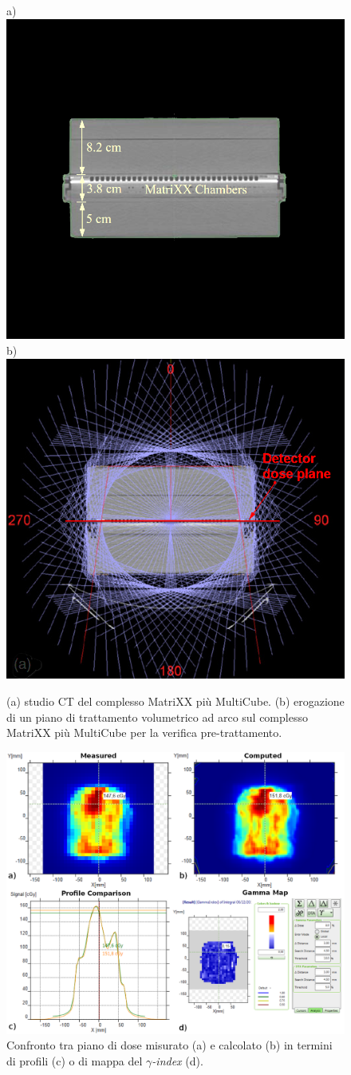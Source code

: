 \begin{figure}
\centering
a)\includegraphics[width=.45\textwidth]{./cap2/MatriXX_CT.png}
b)\includegraphics[width=.45\textwidth]{./cap2/MatriXX_CT_Plan.png}
\caption{(a) studio CT del complesso MatriXX più MultiCube. (b) erogazione di un piano di trattamento volumetrico ad arco sul complesso MatriXX più MultiCube per la verifica pre-trattamento.}
\label{fig:MatriXX_CT}
\end{figure}

\begin{figure}
\centering
\includegraphics[width=\textwidth]{./cap2/gamma_comparison.png}
\caption{Confronto tra piano di dose misurato (a) e calcolato (b) in termini di profili (c) o di mappa del $\gamma$\textit{-index} (d).}
\label{fig:gamma_comparison}
\end{figure}

